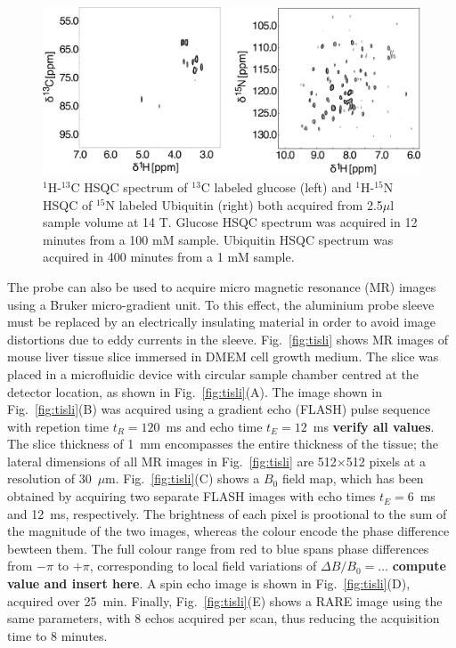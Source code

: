 \documentclass[preprint,5p]{elsarticle}
\newcommand{\todo}[1]{{\color{red}\textbf{#1}}}
\newcommand{\fig}[1]{Fig.~\ref{#1}}
\begin{document}
\begin{figure}
\centering
\includegraphics[width=.7\linewidth,keepaspectratio=true]{./figures/ms5n17-tlp-sp-180612-HSQCspect.png} 
\caption{ $^1$H-$^{13}$C HSQC spectrum of $^{13}$C labeled glucose (left) and $^1$H-$^{15}$N HSQC of $^{15}$N labeled Ubiquitin (right) both acquired from 2.5$\mu$l sample volume at 14 T. Glucose HSQC spectrum was acquired in 12 minutes from a 100 mM sample. Ubiquitin HSQC spectrum was acquired in 400 minutes from a 1 mM sample.}
\label{fig:HSQC} 
\end{figure}
The probe can also be used to acquire micro magnetic resonance (MR) images using a Bruker micro-gradient unit. 
To this effect, the aluminium probe sleeve must be replaced by an electrically insulating material in order to 
avoid image distortions due to eddy currents in the sleeve. 
\fig{fig:tisli} shows MR images of mouse liver tissue slice 
immersed in DMEM cell growth medium.
The slice was placed in a microfluidic device with circular sample chamber centred at the detector location, as 
shown in \fig{fig:tisli}(A). 
The image shown in \fig{fig:tisli}(B) was acquired using a gradient echo (FLASH) pulse sequence with repetion time
$t_R=120$~ms and echo time $t_E=12$~ms \todo{verify all values}. The slice thickness of  1~mm encompasses the entire thickness of the tissue; the 
lateral dimensions of all MR images in \fig{fig:tisli} are 512$\times$512 pixels
at a resolution of 30~$\mu$m.
\fig{fig:tisli}(C) shows a $B_0$ field map, which has been obtained by acquiring
two separate FLASH images with echo times $t_E=6$~ms and 12~ms, respectively.
The brightness of each pixel is prootional to the sum of the magnitude of
the two images, whereas the colour encode the phase difference bewteen them.
The full colour range from red to blue spans phase differences from $-\pi$ to
$+\pi$, corresponding to local field variations of $\Delta B/B_0=...$ 
\todo{compute value and insert here}.
A spin echo image is shown in \fig{fig:tisli}(D), acquired over 25~min. Finally,
\fig{fig:tisli}(E) shows a RARE image using the same parameters, with 8 echos
acquired per scan, thus reducing the acquisition time to 8 minutes.
\end{document}
